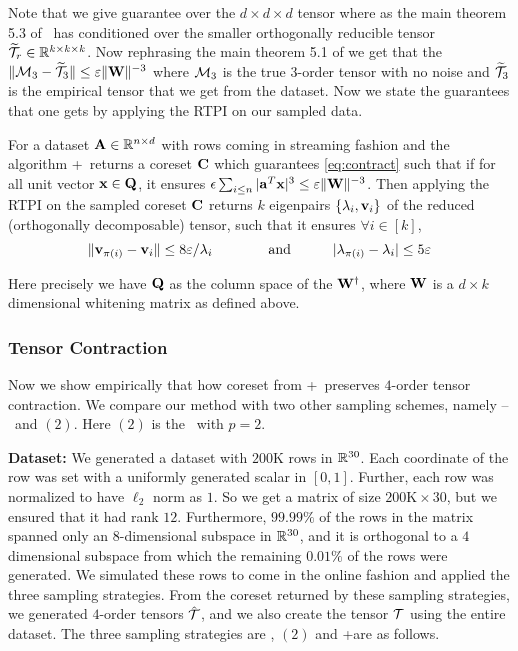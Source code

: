Note that we give guarantee over the $d \times d \times d$ tensor where as the main theorem 5.3 of~\cite{anandkumar2014tensor} has conditioned over the smaller orthogonally reducible tensor $\widetilde{\mcal T}_{r} \in \~R^{k \times k \times k}$. Now rephrasing the main theorem 5.1 of \cite{anandkumar2014tensor} we get that the $\|\mcal M_{3} - \widetilde{\mcal T}_{3}\| \leq \varepsilon\|\*W\|^{-3}$ where $\mcal M_{3}$ is the true $3$-order tensor with no noise and $\widetilde{\mcal T}_{3}$ is the empirical tensor that we get from the dataset. 
Now we state the guarantees that one gets by applying the RTPI on our sampled data.
\begin{corollary}{\label{coro:tensorFactors}}
 For a dataset $\*A \in \~R^{n \times d}$ with rows coming in streaming fashion and the algorithm \online+~returns a coreset $\*C$ which guarantees \eqref{eq:contract} such that if for all unit vector $\*x \in \*Q$, it ensures $\epsilon\sum_{i \leq n} |\*a^{T}\*x|^{3} \leq \varepsilon \|\*W\|^{-3}$. Then applying the RTPI on the sampled coreset $\*C$ returns $k$ eigenpairs $\{\lambda_{i},\*v_{i}\}$ of the reduced (orthogonally decomposable) tensor, such that it ensures $\forall i \in [k]$,
 \begin{equation*}
  \|\*v_{\pi(i)} - \*v_{i}\| \leq 8\varepsilon/\lambda_{i} \qquad \qquad \mbox{and} \quad \qquad |\lambda_{\pi(i)}-\lambda_{i}| \leq 5\varepsilon
 \end{equation*}
\end{corollary}
Here precisely we have $\*Q$ as the column space of the $\*W^{\dagger}$, where $\*W$ is a $d \times k$ dimensional whitening matrix as defined above.
% 
\subsubsection{Tensor Contraction}
Now we show empirically that how coreset from \online+~preserves $4$-order tensor contraction. We compare our method with two other sampling schemes, namely -- \uni~and \online$(2)$. Here \online$(2)$ is the \online~with $p=2$. 

% 
\textbf{Dataset:} We generated a dataset with $200$K rows in $\~R^{30}$. Each coordinate of the row was set with a uniformly generated scalar in $[0,1]$. Further, each row was normalized to have $\ell_{2}$ norm as $1$. So we get a matrix of size $200\text{K} \times 30$, but we ensured that it had rank $12$. Furthermore, $99.99\%$ of the rows in the matrix spanned only an $8$-dimensional subspace in $\~R^{30}$, and it is orthogonal to a $4$ dimensional subspace from which the remaining $0.01\%$ of the rows were generated. We simulated these rows to come in the online fashion and applied the three sampling strategies. From the coreset returned by these sampling strategies, we generated $4$-order tensors $\mcal{\hat{T}}$, and we also create the tensor $\mcal T$ using the entire dataset. The three sampling strategies are \uni, \online$(2)$ and \online+ are as follows.

